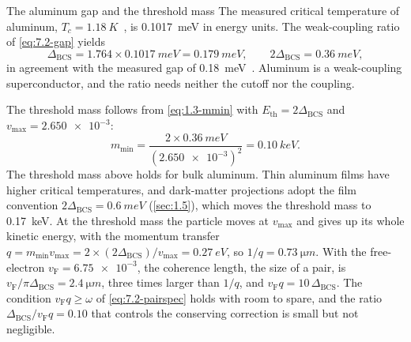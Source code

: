 \begin{workedexample}{The aluminum gap and the threshold mass}\label{we:7-al}
The measured critical temperature of aluminum, $T_c = \SI{1.18}{K}$~\cite[Table~III]{savrasov1996electron}, is \SI{0.1017}{meV} in energy units. The weak-coupling ratio of \cref{eq:7.2-gap} yields
\begin{equation*}
  \Delta_{\mathrm{BCS}} = 1.764\times\SI{0.1017}{meV} = \SI{0.179}{meV}, \qquad 2\Delta_{\mathrm{BCS}} = \SI{0.36}{meV} ,
\end{equation*}
in agreement with the measured gap of \SI{0.18}{meV}~\cite[Table~III]{savrasov1996electron}. Aluminum is a weak-coupling superconductor, and the ratio needs neither the cutoff nor the coupling.

The threshold mass follows from \cref{eq:1.3-mmin} with $E_{\mathrm{th}} = 2\Delta_{\mathrm{BCS}}$ and $v_{\mathrm{max}} = \num{2.650e-3}$:
\begin{equation*}
  m_{\mathrm{min}} = \frac{2\times\SI{0.36}{meV}}{(\num{2.650e-3})^2} = \SI{0.10}{keV} .
\end{equation*}
The threshold mass above holds for bulk aluminum. Thin aluminum films have higher critical temperatures, and dark-matter projections adopt the film convention $2\Delta_{\mathrm{BCS}} = \SI{0.6}{meV}$ (\cref{sec:1.5}), which moves the threshold mass to \SI{0.17}{keV}. At the threshold mass the particle moves at $v_{\mathrm{max}}$ and gives up its whole kinetic energy, with the momentum transfer $q = m_{\mathrm{min}}v_{\mathrm{max}} = 2\times(2\Delta_{\mathrm{BCS}})/v_{\mathrm{max}} = \SI{0.27}{eV}$, so $1/q = \SI{0.73}{\micro m}$. With the free-electron $v_{\mathrm{F}} = \num{6.75e-3}$, the coherence length, the size of a pair, is $v_{\mathrm{F}}/\pi\Delta_{\mathrm{BCS}} = \SI{2.4}{\micro m}$, three times larger than $1/q$, and $v_{\mathrm{F}}q = 10\,\Delta_{\mathrm{BCS}}$. The condition $v_{\mathrm{F}}q \ge \omega$ of \cref{eq:7.2-pairspec} holds with room to spare, and the ratio $\Delta_{\mathrm{BCS}}/v_{\mathrm{F}}q = 0.10$ that controls the conserving correction is small but not negligible.


\end{workedexample}
